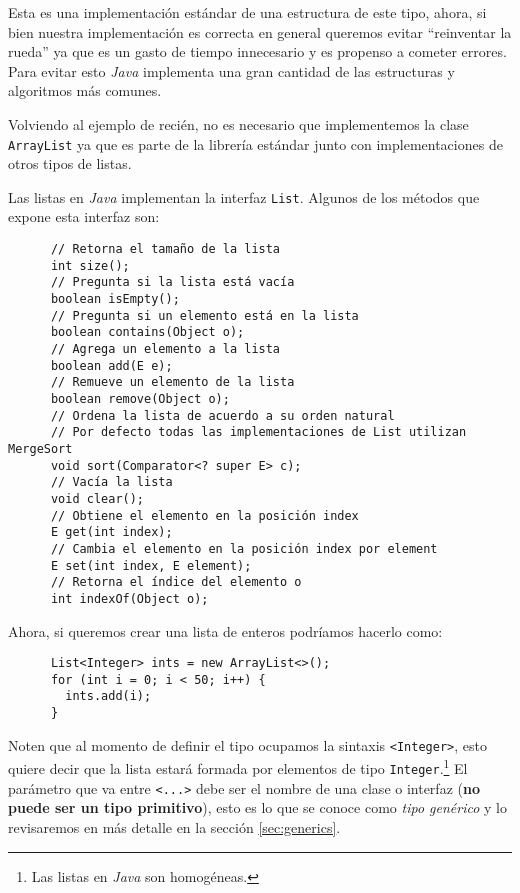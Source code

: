     Esta es una implementación estándar de una estructura de este tipo, ahora, si bien nuestra 
    implementación es correcta en general queremos evitar \enquote{reinventar la rueda} ya que es un
    gasto de tiempo innecesario y es propenso a cometer errores.
    Para evitar esto \textit{Java} implementa una gran cantidad de las estructuras y algoritmos más
    comunes.

    Volviendo al ejemplo de recién, no es necesario que implementemos la clase \texttt{ArrayList} ya
    que es parte de la librería estándar junto con implementaciones de otros tipos de listas.
    
    Las listas en \textit{Java} implementan la interfaz \texttt{List}.
    Algunos de los métodos que expone esta interfaz son:
    \begin{verbatim}
      // Retorna el tamaño de la lista
      int size();
      // Pregunta si la lista está vacía
      boolean isEmpty();
      // Pregunta si un elemento está en la lista
      boolean contains(Object o); 
      // Agrega un elemento a la lista
      boolean add(E e);
      // Remueve un elemento de la lista
      boolean remove(Object o);
      // Ordena la lista de acuerdo a su orden natural
      // Por defecto todas las implementaciones de List utilizan MergeSort
      void sort(Comparator<? super E> c);
      // Vacía la lista
      void clear();
      // Obtiene el elemento en la posición index
      E get(int index);
      // Cambia el elemento en la posición index por element
      E set(int index, E element);
      // Retorna el índice del elemento o
      int indexOf(Object o);
    \end{verbatim}

    Ahora, si queremos crear una lista de enteros podríamos hacerlo como:
    \begin{verbatim}
      List<Integer> ints = new ArrayList<>();
      for (int i = 0; i < 50; i++) {
        ints.add(i);
      }
    \end{verbatim}

    Noten que al momento de definir el tipo ocupamos la sintaxis \texttt{<Integer>}, esto quiere 
    decir que la lista estará formada por elementos de tipo \texttt{Integer}.\footnote{Las 
    listas en \textit{Java} son homogéneas.}
    El parámetro que va entre \texttt{<...>} debe ser el nombre de una clase o interfaz (\textbf{no 
    puede ser un tipo primitivo}), esto es lo que se conoce como \textit{tipo genérico} y lo 
    revisaremos en más detalle en la sección \ref{sec:generics}.

